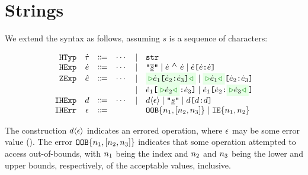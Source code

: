 \documentclass[12pt]{article}
\begin{document}
\section{Strings}
We extend the syntax as follows, assuming $s$ is a sequence of characters:
%
\begin{center}
  \vspace*{-1.5em}
  \[\begin{array}{rccccl}
    \HTyp     & \HTypVar     & \Coloneqq & \cdots & \mid & \HTypStr                                                  \\
    \HExp     & \HExpVar     & \Coloneqq & \cdots & \mid & \HExpStrLit 
                                               \mid   \HExpStrConcat{\HExpVar}{\HExpVar}
                                               \mid   \HExpStrSub{\HExpVar}{\HExpVar}{\HExpVar} \\
    \ZExp     & \ZExpVar     & \Coloneqq & \cdots & \mid & \ZExpStrSub{\HExpVar_1}{\HExpVar_2}{\HExpVar_3} 
                                               \mid   \ZExpStrSubI{\HExpVar_1}{\HExpVar_2}{\HExpVar_3} \\
              &              &           &   & \mid & \ZExpStrSubII{\HExpVar_1}{\HExpVar_2}{\HExpVar_3}
                                               \mid   \ZExpStrSubIII{\HExpVar_1}{\HExpVar_2}{\HExpVar_3} \\
    \IHExp    & \IHExpVar    & \Coloneqq & \cdots & \mid & \IHExpCastExceptVar{\IHExpVar}
                                               \mid   \IHExpStrLit 
                                               \mid   \IHExpStrSub{\IHExpVar}{\IHExpVar}{\IHExpVar} \\
    \IHExcept & \IHExceptVar & \Coloneqq &   &   & \IHExceptOOB{\IHExpNumLitVS{1}}{\IHExpNumLitVS{2}}{\IHExpNumLitVS{3}}
                                               \mid   \IHExceptIE{\IHExpNumLitVS{1}}{\IHExpNumLitVS{2}} \\
  \end{array}\]
\end{center}
%
The \IHExp{} construction $d \langle \epsilon \rangle$ indicates an errored operation, where
$\epsilon$ may be some error value (\IHExcept{}).
%
The error $\texttt{OOB}\{n_1, [n_2, n_3]\}$ indicates that
some operation attempted to access out-of-bounds, with $n_1$ being the index and
$n_2$ and $n_3$ being the lower and upper bounds, respectively, of the
acceptable values, inclusive.
\end{document}
